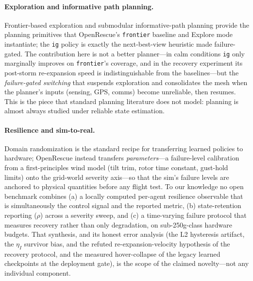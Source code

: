 \documentclass[12pt,a4paper]{article}
\begin{document}
\paragraph{Exploration and informative path planning.}
Frontier-based exploration \cite{Yamauchi1997frontier} and submodular
informative-path planning \cite{Singh2009informative} provide the planning
primitives that OpenRescue's \texttt{frontier} baseline and Explore mode
instantiate; the \texttt{ig} policy is exactly the next-best-view heuristic
made failure-gated. The contribution here is not a better planner---in
calm conditions \texttt{ig} only marginally improves on \texttt{frontier}'s
coverage, and in the recovery experiment its post-storm re-expansion speed is
indistinguishable from the baselines---but the \emph{failure-gated switching}
that suspends exploration and consolidates the mesh when the planner's inputs
(sensing, GPS, comms) become unreliable, then resumes. This is the piece that
standard planning literature does not model: planning is almost always
studied under reliable state estimation.

\paragraph{Resilience and sim-to-real.}
Domain randomization \cite{Tobin2017domain} is the standard recipe for
transferring learned policies to hardware; OpenRescue instead transfers
\emph{parameters}---a failure-level calibration from a first-principles wind
model (tilt trim, rotor time constant, gust-hold limits) onto the grid-world
severity axis---so that the sim's failure levels are anchored to physical
quantities before any flight test. To our knowledge no open benchmark
combines (a) a locally computed per-agent resilience observable that is
simultaneously the control signal and the reported metric, (b) state-retention
reporting ($\rho$) across a severity sweep, and (c) a time-varying failure
protocol that measures recovery rather than only degradation, on
sub-250g-class hardware budgets. That synthesis, and its honest error
analysis (the L2 hysteresis artifact, the $\eta_I$ survivor bias, and the
refuted re-expansion-velocity hypothesis of the recovery protocol, and the measured hover-collapse of the legacy learned checkpoints at the deployment gate), is the
scope of the claimed novelty---not any individual component.
\end{document}
